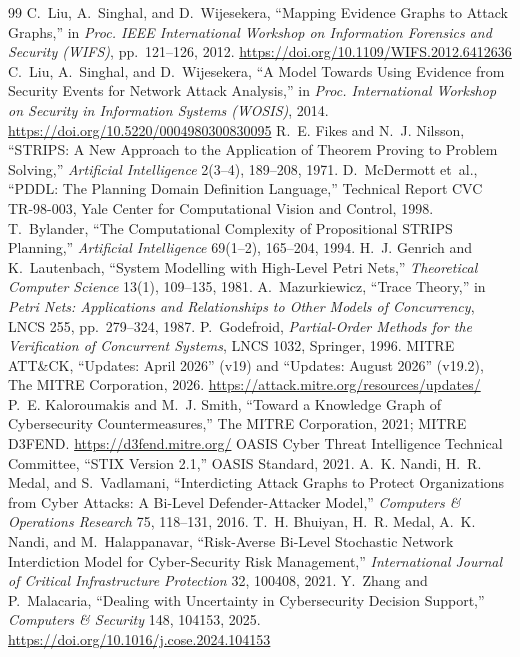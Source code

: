 \documentclass[11pt,letterpaper]{article}
\theoremstyle{definition}
\begin{document}
\begin{thebibliography}{99}
 C.~Liu, A.~Singhal, and D.~Wijesekera, ``Mapping Evidence Graphs to Attack Graphs,'' in \emph{Proc. IEEE International Workshop on Information Forensics and Security (WIFS)}, pp.~121--126, 2012. \url{https://doi.org/10.1109/WIFS.2012.6412636}
 C.~Liu, A.~Singhal, and D.~Wijesekera, ``A Model Towards Using Evidence from Security Events for Network Attack Analysis,'' in \emph{Proc. International Workshop on Security in Information Systems (WOSIS)}, 2014. \url{https://doi.org/10.5220/0004980300830095}
 R.~E. Fikes and N.~J. Nilsson, ``STRIPS: A New Approach to the Application of Theorem Proving to Problem Solving,'' \emph{Artificial Intelligence} 2(3--4), 189--208, 1971.
 D.~McDermott et~al., ``PDDL: The Planning Domain Definition Language,'' Technical Report CVC TR-98-003, Yale Center for Computational Vision and Control, 1998.
 T.~Bylander, ``The Computational Complexity of Propositional STRIPS Planning,'' \emph{Artificial Intelligence} 69(1--2), 165--204, 1994.
 H.~J. Genrich and K.~Lautenbach, ``System Modelling with High-Level Petri Nets,'' \emph{Theoretical Computer Science} 13(1), 109--135, 1981.
 A.~Mazurkiewicz, ``Trace Theory,'' in \emph{Petri Nets: Applications and Relationships to Other Models of Concurrency}, LNCS 255, pp.~279--324, 1987.
 P.~Godefroid, \emph{Partial-Order Methods for the Verification of Concurrent Systems}, LNCS 1032, Springer, 1996.
 MITRE ATT\&CK, ``Updates: April 2026'' (v19) and ``Updates: August 2026'' (v19.2), The MITRE Corporation, 2026. \url{https://attack.mitre.org/resources/updates/}
 P.~E. Kaloroumakis and M.~J. Smith, ``Toward a Knowledge Graph of Cybersecurity Countermeasures,'' The MITRE Corporation, 2021; MITRE D3FEND. \url{https://d3fend.mitre.org/}
 OASIS Cyber Threat Intelligence Technical Committee, ``STIX Version 2.1,'' OASIS Standard, 2021.
 A.~K. Nandi, H.~R. Medal, and S.~Vadlamani, ``Interdicting Attack Graphs to Protect Organizations from Cyber Attacks: A Bi-Level Defender-Attacker Model,'' \emph{Computers \& Operations Research} 75, 118--131, 2016.
 T.~H. Bhuiyan, H.~R. Medal, A.~K. Nandi, and M.~Halappanavar, ``Risk-Averse Bi-Level Stochastic Network Interdiction Model for Cyber-Security Risk Management,'' \emph{International Journal of Critical Infrastructure Protection} 32, 100408, 2021.
 Y.~Zhang and P.~Malacaria, ``Dealing with Uncertainty in Cybersecurity Decision Support,'' \emph{Computers \& Security} 148, 104153, 2025. \url{https://doi.org/10.1016/j.cose.2024.104153}

\end{thebibliography}
\end{document}
